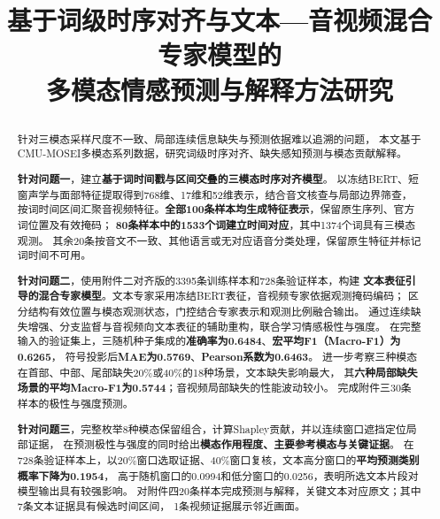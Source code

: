 \documentclass[bwprint]{gmcmthesis}
\title{\parbox{\linewidth}{\centering 基于词级时序对齐与文本—音视频混合专家模型的\\[-3pt]多模态情感预测与解释方法研究}}
\begin{document}
\maketitle
\pagestyle{plain}

\renewcommand{\arraystretch}{1.35}
\setlength{\aboverulesep}{1.2pt}
\setlength{\belowrulesep}{1.2pt}
\setlength{\abovetopsep}{2.0pt}
\setlength{\belowbottomsep}{2.0pt}
\setlength{\LTleft}{0pt plus 1fil}
\setlength{\LTright}{0pt plus 1fil}
\captionsetup[table]{format=plain,justification=centering,singlelinecheck=false}

\begin{abstract}
针对三模态采样尺度不一致、局部连续信息缺失与预测依据难以追溯的问题，
本文基于CMU-MOSEI多模态系列数据，研究词级时序对齐、缺失感知预测与模态贡献解释。

\textbf{针对问题一}，建立\textbf{基于词时间戳与区间交叠的三模态时序对齐模型}。
以冻结BERT、短窗声学与面部特征提取得到768维、17维和52维表示，结合音文核查与局部边界筛查，
按词时间区间汇聚音视频特征。\textbf{全部100条样本均生成特征表示}，保留原生序列、官方词位置及有效掩码；
\textbf{80条样本中的1533个词建立时间对应}，其中1374个词具有三模态观测。
其余20条按音文不一致、其他语言或无对应语音分类处理，保留原生特征并标记词时间不可用。

\textbf{针对问题二}，使用附件二对齐版的3395条训练样本和728条验证样本，构建
\textbf{文本表征引导的混合专家模型}。文本专家采用冻结BERT表征，音视频专家依据观测掩码编码；
区分结构有效位置与模态观测状态，门控结合专家表示和观测比例融合输出。
通过连续缺失增强、分支监督与音视频向文本表征的辅助重构，联合学习情感极性与强度。
在完整输入的验证集上，三随机种子集成的\textbf{准确率为0.6484}、\textbf{宏平均F1（Macro-F1）为0.6265}，
符号投影后\textbf{MAE为0.5769}、\textbf{Pearson系数为0.6463}。
进一步考察三种模态在首部、中部、尾部缺失20\%或40\%的18种场景，文本缺失影响最大，
其\textbf{六种局部缺失场景的平均Macro-F1为0.5744}；音视频局部缺失的性能波动较小。
完成附件三30条样本的极性与强度预测。

\textbf{针对问题三}，完整枚举8种模态保留组合，计算Shapley贡献，并以连续窗口遮挡定位局部证据，
在预测极性与强度的同时给出\textbf{模态作用程度、主要参考模态与关键证据}。
在728条验证样本上，以20\%窗口选取证据、40\%窗口复核，文本高分窗口的\textbf{平均预测类别概率下降为0.1954}，
高于随机窗口的0.0994和低分窗口的0.0256，表明所选文本片段对模型输出具有较强影响。
对附件四20条样本完成预测与解释，关键文本对应原文；其中7条文本证据具有候选时间区间，
1条视频证据展示邻近画面。

\end{abstract}
\end{document}
